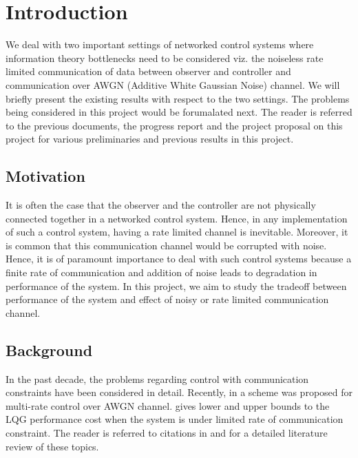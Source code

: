 \documentclass[12pt]{caltech_thesis_progress2}
\begin{document}
\tableofcontents

\mainmatter
\chapter{Introduction}
We deal with two important settings of networked control systems where information theory bottlenecks need to be considered viz. the noiseless rate limited communication of data between observer and controller and communication over AWGN (Additive White Gaussian Noise) channel. We will briefly present the existing results with respect to the two settings. The problems being considered in this project would be forumalated next. The reader is referred to the previous documents, the progress report and the project proposal on this project for various preliminaries and previous results in this project. 
	\section{Motivation}
It is often the case that the observer and the controller are not physically connected together in a networked control system. Hence, in any implementation of such a control system, having a rate limited channel is inevitable. Moreover, it is common that this communication channel would be corrupted with noise. Hence, it is of paramount importance to deal with such control systems because a finite rate of communication and addition of noise leads to degradation in performance of the system. In this project, we aim to study the tradeoff between performance of the system and effect of noisy or rate limited communication channel. 
\section{Background}
In the past decade, the problems regarding control with communication constraints have been considered in detail. Recently, in \cite{anatoly} a scheme was proposed for multi-rate control over AWGN channel. \cite{victoria} gives lower and upper bounds to the LQG performance cost when the system is under limited rate of communication constraint. 
The reader is referred to citations in \cite{anatoly} and \cite{victoria} for a detailed literature review of these topics. 
\end{document}

